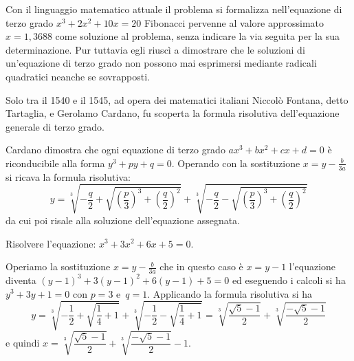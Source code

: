 Con il linguaggio matematico attuale il problema si formalizza nell'equazione 
di 
terzo grado $x^3+2x^2+10x=20$ Fibonacci pervenne al valore approssimato 
$x=1,3688$ come soluzione al problema, senza indicare la via seguita per la sua 
determinazione. Pur tuttavia egli riuscì a dimostrare che le soluzioni di 
un'equazione di terzo grado non possono mai esprimersi mediante radicali 
quadratici neanche se sovrapposti.

Solo tra il 1540 e il 1545, ad opera dei matematici italiani Niccolò Fontana, 
detto Tartaglia, e Gerolamo Cardano, fu scoperta la formula risolutiva 
dell'equazione generale di terzo grado.

Cardano dimostra che ogni equazione di terzo grado $ax^3+bx^2+cx+d=0$ è 
riconducibile alla forma $y^3+{py}+q=0$. Operando con la sostituzione 
$x=y-\frac 
b{3a}$ si ricava la formula risolutiva: 
\[y=\sqrt[3]{-\frac q 2+\sqrt{\left(\frac p 3\right)^3+\left(\frac q 
2\right)^2}}+\sqrt[3]{-\frac q 2-\sqrt{\left(\frac p 3\right)^3+\left(\frac q 
2\right)^2}}\] 
da cui poi risale alla soluzione dell'equazione assegnata.
\begin{esempio}
Risolvere l'equazione: $x^3+3x^2+6x+5=0$.

Operiamo la sostituzione $x=y-\frac b{3a}$ che in questo caso è $x=y-1$ 
l'equazione diventa $(y-1)^3+3(y-1)^2+6(y-1)+5=0$ ed eseguendo i calcoli si ha 
$y^3+3y+1=0$ con $p=3$ e~$q=1$.
Applicando la formula risolutiva si ha 
\[y=\sqrt[3]{-\frac 1 2+\sqrt{\frac 1 4+1}}+\sqrt[3]{-\frac 1 2-\sqrt{\frac 1 
4+1}}=\sqrt[3]{\frac{\sqrt 5-1} 2}+\sqrt[3]{\frac{-\sqrt 5-1} 2}\] 
e quindi $x=\sqrt[3]{\dfrac{\sqrt 5-1} 2}+\sqrt[3]{\dfrac{-\sqrt 5-1} 2}-1$.
\end{esempio}

